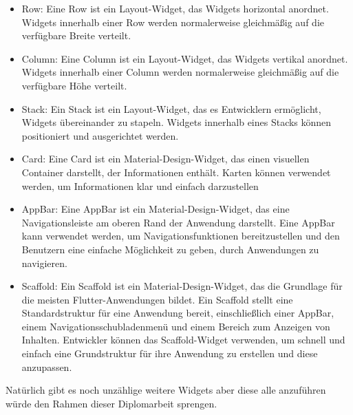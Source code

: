 \begin{itemize}
    \item Row: Eine Row ist ein Layout-Widget, das Widgets horizontal anordnet. Widgets innerhalb einer Row werden normalerweise gleichmäßig auf die verfügbare Breite verteilt.
    \item Column: Eine Column ist ein Layout-Widget, das Widgets vertikal anordnet. Widgets innerhalb einer Column werden normalerweise gleichmäßig auf die verfügbare Höhe verteilt.
    \item Stack: Ein Stack ist ein Layout-Widget, das es Entwicklern ermöglicht, Widgets übereinander zu stapeln. Widgets innerhalb eines Stacks können positioniert und ausgerichtet werden.
    \item Card: Eine Card ist ein Material-Design-Widget, das einen visuellen Container darstellt, der Informationen enthält. Karten können verwendet werden, um Informationen klar und einfach darzustellen 
    \item AppBar: Eine AppBar ist ein Material-Design-Widget, das eine Navigationsleiste am oberen Rand der Anwendung darstellt. Eine AppBar kann verwendet werden, um Navigationsfunktionen bereitzustellen und den Benutzern eine einfache Möglichkeit zu geben, durch Anwendungen zu navigieren.
    \item Scaffold: Ein Scaffold ist ein Material-Design-Widget, das die Grundlage für die meisten Flutter-Anwendungen bildet. Ein Scaffold stellt eine Standardstruktur für eine Anwendung bereit, einschließlich einer AppBar, einem Navigationsschubladenmenü und einem Bereich zum Anzeigen von Inhalten. Entwickler können das Scaffold-Widget verwenden, um schnell und einfach eine Grundstruktur für ihre Anwendung zu erstellen und diese anzupassen.
\end{itemize}
Natürlich gibt es noch unzählige weitere Widgets aber diese alle anzuführen würde den Rahmen dieser Diplomarbeit sprengen.



